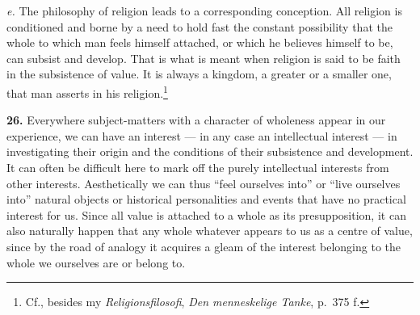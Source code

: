 \documentclass[12pt]{book}
\newcommand{\hnum}[1]{\textbf{#1.}\enspace}
\begin{document}
\textit{e.} The philosophy of religion leads to a corresponding conception. All religion
is conditioned and borne by a need to hold fast the constant possibility that the whole
to which man feels himself attached, or which he believes himself to be, can subsist and
develop. That is what is meant when religion is said to be faith in the subsistence of
value. It is always a kingdom, a greater or a smaller one, that man asserts in his
religion.\footnote{Cf., besides my \textit{Religionsfilosofi}, \textit{Den menneskelige
Tanke}, p.\ 375 f.}

\hnum{26} Everywhere subject-matters with a character of wholeness appear in our
experience, we can have an interest --- in any case an intellectual interest --- in
investigating their origin and the conditions of their subsistence and development. It
can often be difficult here to mark off the purely intellectual interests from other
interests. Aesthetically we can thus ``feel ourselves into'' or ``live ourselves into''
natural objects or historical personalities and events that have no practical interest
for us. Since all value is attached to a whole as its presupposition, it can also
naturally happen that any whole whatever appears to us as a centre of value, since by
the road of analogy it acquires a gleam of the interest belonging to the whole we
ourselves are or belong to.
\end{document}
